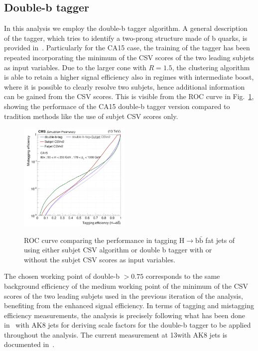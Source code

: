 \subsection{Double-b tagger}

In this analysis we employ the double-b tagger algorithm. A general description of the tagger, which tries to identify a two-prong structure made of b quarks, is provided in~\cite{CMS-PAS-BTV-15-002}. Particularly for the CA15 case, the training of the tagger has been repeated incorporating the minimum of the CSV scores of the two leading subjets as input variables. Due to the larger cone with $R=1.5$, the clustering algorithm is able to retain a higher signal efficiency also in regimes with intermediate boost, where it is possible to clearly resolve two subjets, hence additional information can be gained from the CSV scores. This is visible from the ROC curve in Fig.~\ref{fig:doublebroc}, showing the performace of the CA15 double-b tagger version compared to tradition methods like the use of subjet CSV scores only.


\begin{figure}
  \centering
  \includegraphics[width=0.475\textwidth]{figures/higgstagging/doubleb/doubleb_roc_split.png}\\
  \caption{ROC curve comparing the performance in tagging $\text{H}\to\text{b}\bar{\text{b}}$ fat jets of using either subjet CSV algorithm or double b tagger with or without the subjet CSV scores as input variables.}
  \label{fig:doublebroc}
\end{figure}

The chosen working point of double-b $> 0.75$ corresponds to the same background efficiency of the medium working point of the minimum of the CSV scores of the two leading subjets used in the previous iteration of the analysis, benefiting from the enhanced signal efficiency.
In terms of tagging and mistagging efficiency measurements, the analysis is precisely following what has been done in~\cite{CMS-PAS-BTV-15-002} with AK8 jets for deriving scale factors for the double-b tagger to be applied throughout the analysis. The current measurement at 13\TeV with AK8 jets is documented in~\cite{Ref:BTAG2016}.

